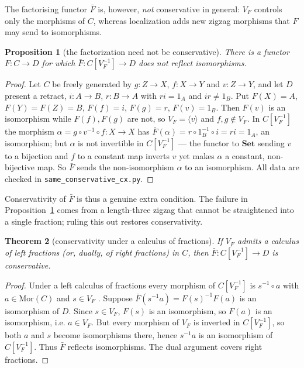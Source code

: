 \documentclass[11pt]{amsart}
\newtheorem{thm}{Theorem}[section]
\newtheorem{prop}[thm]{Proposition}
\theoremstyle{definition}
\newcommand{\Mor}{\mathrm{Mor}}
\begin{document}
The factorising functor $\bar F$ is, however, \emph{not} conservative in general:
$V_F$ controls only the morphisms of $C$, whereas localization adds new zigzag
morphisms that $F$ may send to isomorphisms.

\begin{prop}[the factorization need not be conservative]\label{prop:notcons}
There is a functor $F\colon C\to D$ for which $\bar F\colon C[V_F^{-1}]\to D$
does not reflect isomorphisms.
\end{prop}

\begin{proof}
Let $C$ be freely generated by $g\colon Z\to X$, $f\colon X\to Y$ and
$v\colon Z\to Y$, and let $D$ present a retract, $i\colon A\to B$, $r\colon B\to
A$ with $ri=1_A$ and $ir\ne1_B$. Put $F(X)=A$, $F(Y)=F(Z)=B$, $F(f)=i$,
$F(g)=r$, $F(v)=1_B$. Then $F(v)$ is an isomorphism while $F(f),F(g)$ are not, so
$V_F=\langle v\rangle$ and $f,g\notin V_F$. In $C[V_F^{-1}]$ the morphism
$\alpha=g\circ v^{-1}\circ f\colon X\to X$ has
$\bar F(\alpha)=r\circ 1_B^{-1}\circ i=ri=1_A$, an isomorphism; but $\alpha$ is
not invertible in $C[V_F^{-1}]$ --- the functor to $\mathbf{Set}$ sending $v$ to a
bijection and $f$ to a constant map inverts $v$ yet makes $\alpha$ a constant,
non-bijective map. So $\bar F$ sends the non-isomorphism $\alpha$ to an
isomorphism. All data are checked in \texttt{same\_conservative\_cx.py}.
\end{proof}

Conservativity of $\bar F$ is thus a genuine extra condition. The failure in
Proposition~\ref{prop:notcons} comes from a length-three zigzag that cannot be
straightened into a single fraction; ruling this out restores conservativity.

\begin{thm}[conservativity under a calculus of fractions]\label{thm:consfrac}
If $V_F$ admits a calculus of left fractions (or, dually, of right fractions) in
$C$, then $\bar F\colon C[V_F^{-1}]\to D$ is conservative.
\end{thm}

\begin{proof}
Under a left calculus of fractions every morphism of $C[V_F^{-1}]$ is
$s^{-1}\circ a$ with $a\in\Mor(C)$ and $s\in V_F$ \cite{GZ}. Suppose
$\bar F(s^{-1}a)=F(s)^{-1}F(a)$ is an isomorphism of $D$. Since $s\in V_F$,
$F(s)$ is an isomorphism, so $F(a)$ is an isomorphism, i.e. $a\in V_F$. But every
morphism of $V_F$ is inverted in $C[V_F^{-1}]$, so both $a$ and $s$ become
isomorphisms there, hence $s^{-1}a$ is an isomorphism of $C[V_F^{-1}]$. Thus
$\bar F$ reflects isomorphisms. The dual argument covers right fractions.
\end{proof}
\end{document}
